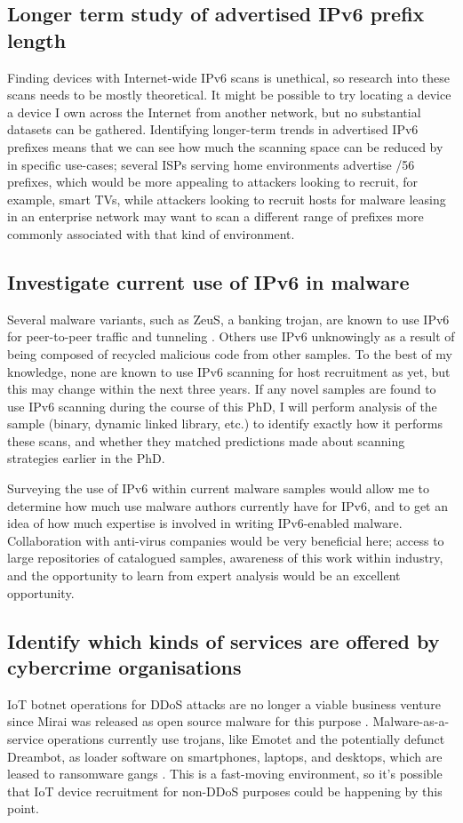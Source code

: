 \documentclass[10pt,sigconf]{acmart}
\begin{document}
\subsection{Longer term study of advertised IPv6 prefix length}
Finding devices with Internet-wide IPv6 scans is unethical, so research into these scans needs to be mostly theoretical.
It might be possible to try locating a device a device I own across the Internet from another network, but no substantial datasets can be gathered.
Identifying longer-term trends in advertised IPv6 prefixes means that we can see how much the scanning space can be reduced by in specific use-cases;
several ISPs serving home environments advertise /56 prefixes, which would be more appealing to attackers looking to recruit, for example, smart TVs, while attackers looking to recruit hosts for malware leasing in an enterprise network may want to scan a different range of prefixes more commonly associated with that kind of environment.

\subsection{Investigate current use of IPv6 in malware}
Several malware variants, such as ZeuS, a banking trojan, are known to use IPv6 for peer-to-peer traffic and tunneling \cite{zeus}.
Others use IPv6 unknowingly as a result of being composed of recycled malicious code from other samples.
To the best of my knowledge, none are known to use IPv6 scanning for host recruitment as yet, but this may change within the next three years.
If any novel samples are found to use IPv6 scanning during the course of this PhD, I will perform analysis of the sample (binary, dynamic linked library, etc.) to identify exactly how it performs these scans, and whether they matched predictions made about scanning strategies earlier in the PhD.

Surveying the use of IPv6 within current malware samples would allow me to determine how much use malware authors currently have for IPv6, and to get an idea of how much expertise is involved in writing IPv6-enabled malware.
Collaboration with anti-virus companies would be very beneficial here;
access to large repositories of catalogued samples, awareness of this work within industry, and the opportunity to learn from expert analysis would be an excellent opportunity.

\subsection{Identify which kinds of services are offered by cybercrime organisations}
IoT botnet operations for DDoS attacks are no longer a viable business venture since Mirai was released as open source malware for this purpose \cite{mirai-open-source}.
Malware-as-a-service operations currently use trojans, like Emotet and the potentially defunct Dreambot, as loader software on smartphones, laptops, and desktops, which are leased to ransomware gangs \cite{emotet-lease} \cite{dreambot}.
This is a fast-moving environment, so it's possible that IoT device recruitment for non-DDoS purposes could be happening by this point.
\end{document}
